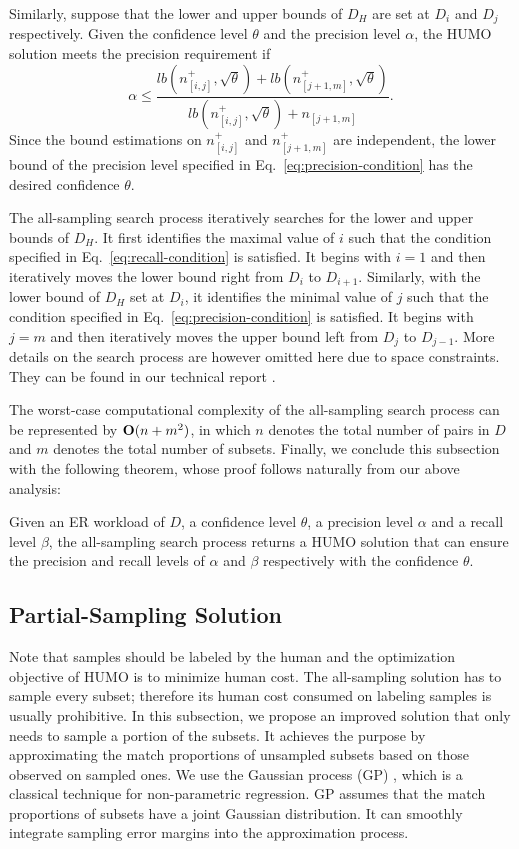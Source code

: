   Similarly, suppose that the lower and upper bounds of $D_H$ are set at $D_i$ and $D_j$ respectively. Given the confidence level $\theta$ and the precision level $\alpha$, the HUMO solution meets the precision requirement if
\begin{equation}
\label{eq:precision-condition}
  \alpha\leq \frac{lb(n_{[i,j]}^{+}, \sqrt{\theta}) + lb(n_{[j+1,m]}^{+}, \sqrt{\theta})}{lb(n_{[i,j]}^{+}, \sqrt{\theta}) + n_{[j+1,m]}}.
\end{equation}
Since the bound estimations on $n_{[i,j]}^{+}$ and $n_{[j+1,m]}^{+}$ are independent, the lower bound of the precision level specified in Eq.~\ref{eq:precision-condition} has the desired confidence $\theta$.

  The all-sampling search process iteratively searches for the lower and upper bounds of $D_H$. It first identifies the maximal value of $i$ such that the condition specified in Eq.~\ref{eq:recall-condition} is satisfied. It begins with $i=1$ and then iteratively moves the lower bound right from $D_i$ to $D_{i+1}$. Similarly, with the lower bound of $D_H$ set at $D_i$, it identifies the minimal value of $j$ such that the condition specified in Eq.~\ref{eq:precision-condition} is satisfied. It begins with $j=m$ and then iteratively moves the upper bound left from $D_j$ to $D_{j-1}$. More details on the search process are however omitted here due to space constraints. They can be found in our technical report \cite{chen2017humoreport}.

  The worst-case computational complexity of the all-sampling search process can be represented by ${\bf O}(n+m^2)$, in which $n$ denotes the total number of pairs in $D$ and $m$ denotes the total number of subsets. Finally, we conclude this subsection with the following theorem, whose proof follows naturally from our above analysis:
\begin{theorem}
  Given an ER workload of $D$, a confidence level $\theta$, a precision level $\alpha$ and a recall level $\beta$, the all-sampling search process returns a HUMO solution that can ensure the precision and recall levels of $\alpha$ and $\beta$ respectively with the confidence $\theta$.
\end{theorem}


\subsection{Partial-Sampling Solution} \label{sec:partial-sampling}

 Note that samples should be labeled by the human and the optimization objective of HUMO is to minimize human cost. The all-sampling solution has to sample every subset; therefore its human cost consumed on labeling samples is usually prohibitive. In this subsection, we propose an improved solution that only needs to sample a portion of the subsets. It achieves the purpose by approximating the match proportions of unsampled subsets based on those observed on sampled ones. We use the Gaussian process (GP) \cite{rasmussen2006gaussian}, which is a classical technique for non-parametric regression. GP assumes that the match proportions of subsets have a joint Gaussian distribution. It can smoothly integrate sampling error margins into the approximation process.

